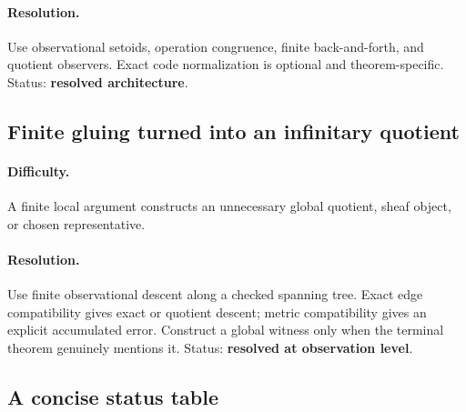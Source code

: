 \paragraph{Resolution.}
Use observational setoids, operation congruence, finite back-and-forth, and quotient observers.  Exact code normalization is optional and theorem-specific.  Status: \textbf{resolved architecture}.

\subsection{Finite gluing turned into an infinitary quotient}

\paragraph{Difficulty.}
A finite local argument constructs an unnecessary global quotient, sheaf object, or chosen representative.

\paragraph{Resolution.}
Use finite observational descent along a checked spanning tree.  Exact edge compatibility gives exact or quotient descent; metric compatibility gives an explicit accumulated error.  Construct a global witness only when the terminal theorem genuinely mentions it.  Status: \textbf{resolved at observation level}.

\subsection{A concise status table}

